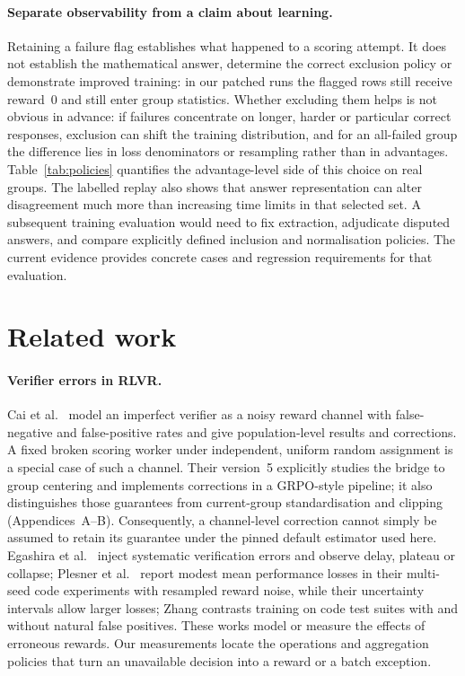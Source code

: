 \documentclass[10pt,a4paper]{article}
\let\cite\citep
\begin{document}
\paragraph{Separate observability from a claim about learning.}
Retaining a failure flag establishes what happened to a scoring attempt.
It does not establish the mathematical answer, determine the correct
exclusion policy or demonstrate improved training: in our patched runs the
flagged rows still receive reward~0 and still enter group statistics.
Whether excluding them helps is not obvious in advance: if failures
concentrate on longer, harder or particular correct responses, exclusion can
shift the training distribution, and for an all-failed group the difference
lies in loss denominators or resampling rather than in advantages.
Table~\ref{tab:policies} quantifies the advantage-level side of this choice
on real groups. The labelled replay
also shows that answer representation can alter disagreement much more
than increasing time limits in that selected set. A subsequent training
evaluation would need to fix extraction, adjudicate disputed answers, and
compare explicitly defined inclusion and normalisation policies. The
current evidence provides concrete cases and regression requirements for
that evaluation.

\section{Related work}
\label{sec:related}

\paragraph{Verifier errors in RLVR.}
Cai et al.\ \cite{cai2025noisy} model an imperfect verifier as a noisy reward
channel with false-negative and false-positive rates and give population-level
results and corrections. A fixed broken scoring worker under independent,
uniform random assignment is a special case of such a channel. Their
version~5 explicitly studies the bridge to group centering and implements
corrections in a GRPO-style pipeline; it also distinguishes those guarantees
from current-group standardisation and clipping (Appendices~A--B).
Consequently, a channel-level correction cannot simply be assumed to retain
its guarantee under the pinned default estimator used here. Egashira et al.\ \cite{egashira2026delay} inject systematic verification
errors and observe delay, plateau or collapse; Plesner et al.\
\cite{plesner2026imperfect} report modest mean performance losses in their
multi-seed code experiments with resampled reward noise, while their
uncertainty intervals allow larger losses; Zhang \cite{zhang2026leaky} contrasts training on
code test suites with and without natural false positives. These works
model or measure the effects of erroneous rewards. Our measurements locate
the operations and aggregation policies that turn an unavailable decision
into a reward or a batch exception.
\end{document}
